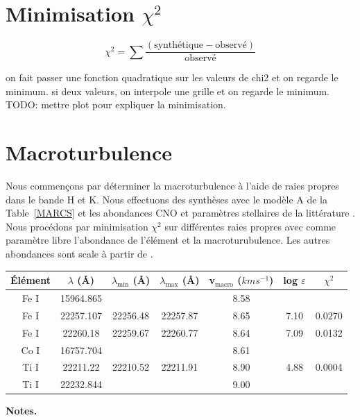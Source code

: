 \section{\sc Minimisation \texorpdfstring{$\chi^2$}{chi-squared}}

$$\chi^2 = \sum \frac{(\text{synth\'etique}-\text{observ\'e})}{\text{observ\'e}}$$

on fait passer une fonction quadratique sur les valeurs de chi2 et on regarde le minimum.
si deux valeurs, on interpole une grille et on regarde le minimum.
TODO: mettre plot pour expliquer la minimisation. 

\section{Macroturbulence}
Nous commençons par déterminer la macroturbulence à l'aide de raies propres dans le bande H et K. Nous effectuons des synthèses avec le modèle A de la Table~\ref{MARCS} et les abondances CNO et paramètres stellaires de la littérature \cite{shetye_s_2018}. Nous procédons par minimisation $\chi^2$ sur différentes raies propres avec comme paramètre libre l'abondance de l'élément et la macroturubulence. 
Les autres abondances sont scale à partir de \cite{grevesse_solar_2007}.

\begin{table}[h!]
\vspace{0.3cm}

\begin{center}
	\begin{tabular}{ccccccc}
        \hline
		\hline
        Élément & $\lambda$ (Å) & $\lambda_{\mathrm{min}}$ (Å) & $\lambda_{\mathrm{max}}$ (Å)& v$_{\mathrm{macro}}$ ($km s^{-1}$) & log $\varepsilon$ & $\chi^2$\\
        \hline
    Fe I & 15964.865 &&& 8.58 && \\
    Fe I & 22257.107 &22256.48&22257.87& 8.65 &7.10& 0.0270\\
    Fe I & 22260.18 &22259.67&22260.77& 8.64 & 7.09 & 0.0132\\
		Co I & 16757.704&& & 8.61 && \\
		Ti I & 22211.22 & 22210.52 & 22211.91 & 8.90 & 4.88 & 0.0004\\
		Ti I & 22232.844&& & 9.00 &&\\
    \end{tabular}
\end{center} 
\textbf{Notes.} 
\label{macro}
\end{table}

